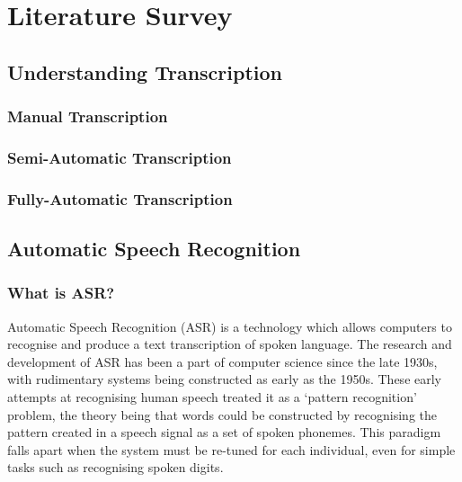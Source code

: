 \chapter{Literature Survey}\label{ch:literature-survey}

\section{Understanding Transcription}\label{sec:transcription}

\subsection{Manual Transcription}\label{subsec:manual-transcription}

\subsection{Semi-Automatic Transcription}\label{subsec:semi-auto-transcription}

\subsection{Fully-Automatic Transcription}\label{subsec:full-auto-transcription}


\section{Automatic Speech Recognition}\label{sec:what-is-asr}

\subsection{What is ASR?}

Automatic Speech Recognition (ASR) is a technology which allows computers to recognise and produce a text transcription of spoken language.
The research and development of ASR has been a part of computer science since the late 1930s\cite{Rabiner2004Jan,vocoder}, with rudimentary systems being constructed as early as the 1950s\cite{asr-52}.
These early attempts at recognising human speech treated it as a `pattern recognition' problem, the theory being that words could be constructed by recognising the pattern created in a speech signal as a set of spoken phonemes\cite{Rabiner2004Jan}. 
This paradigm falls apart when the system must be re-tuned for each individual, even for simple tasks such as recognising spoken digits\cite{asr-52}.

